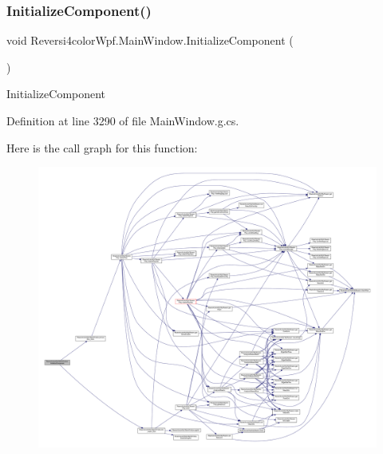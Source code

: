 \subsubsection{\texorpdfstring{Initialize\+Component()}{InitializeComponent()}\hspace{0.1cm}{\footnotesize\ttfamily [2/4]}}
{\footnotesize\ttfamily void Reversi4color\+Wpf.\+Main\+Window.\+Initialize\+Component (\begin{DoxyParamCaption}{ }\end{DoxyParamCaption})}



Initialize\+Component 



Definition at line 3290 of file Main\+Window.\+g.\+cs.

Here is the call graph for this function\+:
\nopagebreak
\begin{figure}[H]
\begin{center}
\leavevmode
\includegraphics[width=350pt]{class_reversi4color_wpf_1_1_main_window_a20f84946e71f327820f3ccbefca1f3a0_cgraph}
\end{center}
\end{figure}
\mbox{\label{class_reversi4color_wpf_1_1_main_window_a20f84946e71f327820f3ccbefca1f3a0}} 
